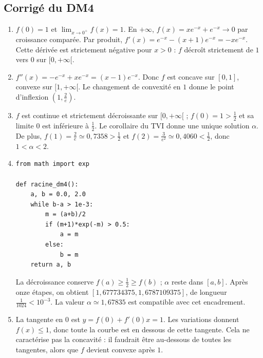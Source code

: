 \subsection{Corrigé du DM4}\begin{enumerate}
\item $f(0)=1$ et $\lim_{x\to0^+}f(x)=1$. En $+\infty$, $f(x)=xe^{-x}+e^{-x}\to0$ par croissance comparée. Par produit, $f'(x)=e^{-x}-(x+1)e^{-x}=-xe^{-x}$. Cette dérivée est strictement négative pour $x>0$ : $f$ décroît strictement de $1$ vers $0$ sur $[0,+\infty[$.
\item $f''(x)=-e^{-x}+xe^{-x}=(x-1)e^{-x}$. Donc $f$ est concave sur $[0,1]$, convexe sur $[1,+\infty[$. Le changement de convexité en $1$ donne le point d'inflexion $(1,\frac{2}{e})$.
\item $f$ est continue et strictement décroissante sur $[0,+\infty[$ ; $f(0)=1>\frac{1}{2}$ et sa limite $0$ est inférieure à $\frac{1}{2}$. Le corollaire du TVI donne une unique solution $\alpha$. De plus, $f(1)=\frac{2}{e}\simeq0{,}7358>\frac{1}{2}$ et $f(2)=\frac{3}{e^2}\simeq0{,}4060<\frac{1}{2}$, donc $1<\alpha<2$.
\item 
\begin{lstlisting}
from math import exp

def racine_dm4():
    a, b = 0.0, 2.0
    while b-a > 1e-3:
        m = (a+b)/2
        if (m+1)*exp(-m) > 0.5:
            a = m
        else:
            b = m
    return a, b
\end{lstlisting}
La décroissance conserve $f(a)\ge\frac{1}{2}\ge f(b)$ ; $\alpha$ reste dans $[a,b]$. Après onze étapes, on obtient $[1{,}677734375,1{,}6787109375]$, de longueur $\frac{1}{1024}<10^{-3}$. La valeur $\alpha\simeq1{,}67835$ est compatible avec cet encadrement.
\item La tangente en $0$ est $y=f(0)+f'(0)x=1$. Les variations donnent $f(x)\le1$, donc toute la courbe est en dessous de cette tangente. Cela ne caractérise pas la concavité : il faudrait être au-dessous de toutes les tangentes, alors que $f$ devient convexe après $1$.
\end{enumerate}

\clearpage


